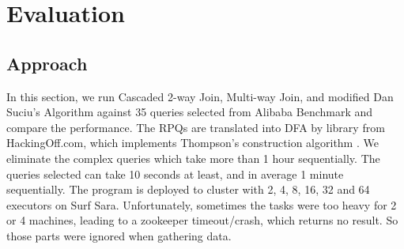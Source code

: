 \chapter{\label{cha:evaluation}Evaluation}
\section{Approach}
In this section, we run Cascaded 2-way Join, Multi-way Join, and modified Dan Suciu's Algorithm against 35 queries selected from Alibaba Benchmark and compare the performance. The RPQs are translated into DFA by library \cite{hackingoff} from HackingOff.com, which implements Thompson's construction algorithm \cite{Thompson:1968:PTR:363347.363387}. We eliminate the complex queries which take more than 1 hour sequentially. The queries selected can take 10 seconds at least, and in average 1 minute sequentially. The program is deployed to cluster with 2, 4, 8, 16, 32 and 64 executors on Surf Sara. Unfortunately, sometimes the tasks were too heavy for 2 or 4 machines, leading to a zookeeper timeout/crash, which returns no result. So those parts were ignored when gathering data.
